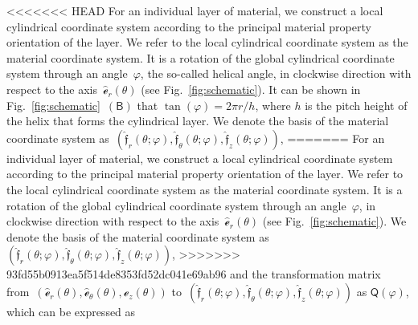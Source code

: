 \documentclass[preprint,10pt,times]{elsarticle}
\numberwithin{equation}{section}
\newcommand{\physe}{\hat{\mathscr{e}}} %
\newcommand{\physf}{\hat{\boldsymbol{\mathfrak{f}}}}
\renewcommand{\u}[1]{\boldsymbol{#1}}
\newcommand{\usf}[1]{\u{\mathsf #1}}
\newcommand{\pr}[1]{\left( #1 \right)}
\newcommand{\subf}[1]{\pr{\textsf{#1}}}
\renewcommand{\>}{$\Rightarrow$}
\begin{document}
<<<<<<< HEAD
For an individual layer of material, we construct a local cylindrical coordinate system according to the principal material property orientation of the layer. We refer to the local cylindrical coordinate system as the material coordinate system. It is a rotation of the global cylindrical coordinate system through an angle~$\varphi$, the so-called helical angle, in clockwise direction with respect to the axis~$\physe_{r}(\theta)$ (see Fig.~\ref{fig:schematic}).
It can be shown in Fig.~\ref{fig:schematic}~$\subf{B}$ that $\tan(\varphi) = 2 \pi r/h$, where $h$ is the pitch height of the helix that forms the cylindrical layer. We denote the basis of the material coordinate system as~$\pr{\physf_{r}(\theta;\varphi),\physf_{\theta}(\theta;\varphi),\physf_{z}(\theta;\varphi)}$,
=======
For an individual layer of material, we construct a local cylindrical coordinate system according to the principal material property orientation of the layer. We refer to the local cylindrical coordinate system as the material coordinate system. It is a rotation of the global cylindrical coordinate system through an angle~$\varphi$, in clockwise direction with respect to the axis~$\physe_{r}(\theta)$ (see Fig.~\ref{fig:schematic}). We denote the basis of the material coordinate system as~$\pr{\physf_{r}(\theta;\varphi),\physf_{\theta}(\theta;\varphi),\physf_{z}(\theta;\varphi)}$, 
>>>>>>> 93fd55b0913ea5f514de8353fd52dc041e69ab96
and the transformation matrix from~$(\physe_{r}(\theta),\physe_{\theta}(\theta),\physe_{z}(\theta))$ to~$\pr{\physf_{r}(\theta;\varphi),\physf_{\theta}(\theta;\varphi),\physf_{z}(\theta;\varphi)}$ as $\usf{Q}(\varphi)$, which can be expressed as
\end{document}
